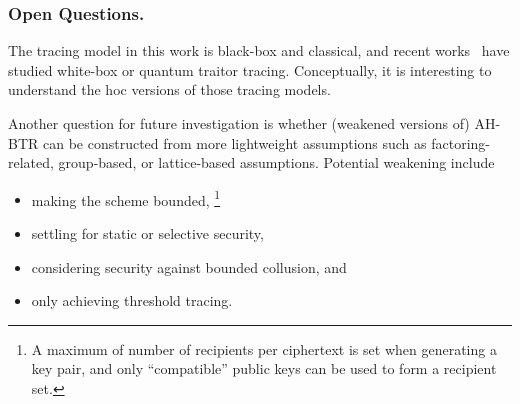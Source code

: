 \subsubsection{Open Questions.}
The tracing model in this work is black-box and classical, and recent works~\cite{C:Zhandry21,TCC:Zhandry20} have studied white-box or quantum traitor tracing.
Conceptually, it is interesting to understand the \ad hoc versions of those tracing models.

Another question for future investigation is whether
(weakened versions of) AH-BTR can be constructed from more lightweight assumptions such as factoring-related, group-based, or lattice-based assumptions.
Potential weakening include
\begin{itemize}
\item making the scheme bounded,%
\footnote{A maximum of number of recipients per ciphertext is set when generating a key pair, and only ``compatible'' public keys can be used to form a recipient set.}
\item settling for static or selective security,
\item considering security against bounded collusion, and
\item only achieving threshold tracing.
\end{itemize}
